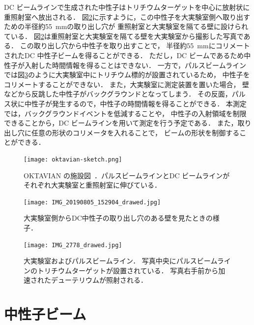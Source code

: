 \documentclass[../master]{subfiles}
\begin{document}
DC ビームラインで生成された中性子はトリチウムターゲットを中心に放射状に重照射室へ放出される．
図\ref{pic::hole}に示すように，この中性子を大実験室側へ取り出すための半径約\SI{55}{\milli\metre}の取り出し穴が
重照射室と大実験室を隔てる壁に設けられている．
図\ref{pic::hole}は重照射室と大実験室を隔てる壁を大実験室から撮影した写真である．
この取り出し穴から中性子を取り出すことで，
半径約\SI{55}{\milli\metre}にコリメートされたDC 中性子ビームを得ることができる．
ただし，DC ビームであるため中性子が入射した時間情報を得ることはできない．
一方で，パルスビームラインでは図\ref{pic::pulse_beam_line}のように大実験室中にトリチウム標的が設置されているため，
中性子をコリメートすることができない．
また，大実験室に測定装置を置いた場合，
壁などから反跳した中性子がバックグラウンドとなってしまう．
その反面，パルス状に中性子が発生するので，中性子の時間情報を得ることができる．
本測定では，バックグラウンドイベントを低減することや，
中性子の入射領域を制限できることから，DC ビームラインを用いて測定を行う予定である．
また，取り出し穴に任意の形状のコリメータを入れることで，
ビームの形状を制御することができる．
\begin{figure}
  \centering
  \texttt{[image: oktavian-sketch.png]}
  \caption[OKTAVIAN の施設図．]
          {OKTAVIAN の施設図~\cite{oktavian}．パルスビームラインとDC ビームラインがそれぞれ大実験室と重照射室に伸びている．}
  \label{pic::oktavian-sketch}
\end{figure}
\begin{figure}[h]
  \centering
  \texttt{[image: IMG\_20190805\_152904\_drawed.jpg]}
  \caption{大実験室側からDC中性子の取り出し穴のある壁を見たときの様子．}
  \label{pic::hole}
\end{figure}
\begin{figure}[h]
  \centering
  \texttt{[image: IMG\_2778\_drawed.jpg]}
  \caption[大実験室およびパルスビームライン．]
          {大実験室およびパルスビームライン．
            写真中央にパルスビームラインのトリチウムターゲットが設置されている．
          写真右手前から加速されたデューテリウムが照射される．}
  \label{pic::pulse_beam_line}
\end{figure}

\section{中性子ビーム}
\end{document}
